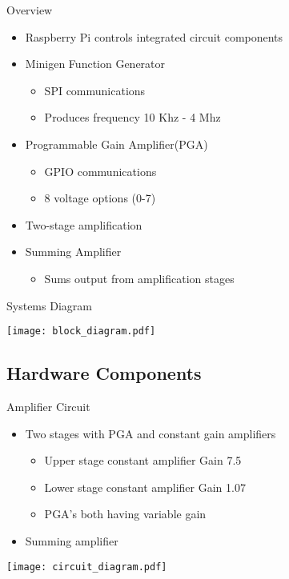 \begin{frame}{Overview}
\begin{block}{}
  \begin{itemize}
    \item Raspberry Pi controls integrated circuit components
    \item Minigen Function Generator
    \begin{itemize}
      \item SPI communications
      \item Produces frequency 10 Khz - 4 Mhz
    \end{itemize}
     \item Programmable Gain Amplifier(PGA)
    \begin{itemize}
      \item GPIO communications
      \item 8 voltage options (0-7)
    \end{itemize}
    \item Two-stage amplification
    \item Summing Amplifier
    \begin{itemize}
      \item Sums output from amplification stages
    \end{itemize}
  \end{itemize}
\end{block}
\end{frame}

\begin{frame}{Systems Diagram}
  \begin{center}
  \texttt{[image: block\_diagram.pdf]}
  \end{center}
\end{frame}

\subsection{Hardware Components}

\begin{frame}{Amplifier Circuit}
  \begin{itemize}
    \item Two stages with PGA and constant gain amplifiers
    \begin{itemize}
      \item Upper stage constant amplifier Gain 7.5 
      \item Lower stage constant amplifier Gain 1.07
      \item PGA's both having variable gain
    \end{itemize}
    \item Summing amplifier
  \end{itemize}

  \texttt{[image: circuit\_diagram.pdf]}
\end{frame}

